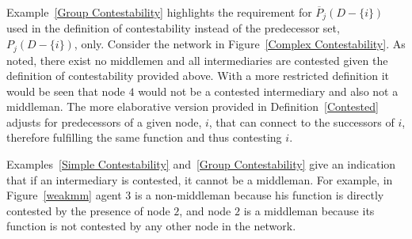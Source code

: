Example~\ref{Group Contestability} highlights the requirement for $\overline{P}_{j}(D - \{i\})$ used in the definition of contestability instead of the predecessor set, $P_{j}(D - \{i\})$, only. Consider the network in Figure~\ref{Complex Contestability}. As noted, there exist no middlemen and all intermediaries are contested given the definition of contestability provided above. With a more restricted definition it would be seen that node $4$ would not be a contested intermediary and also not a middleman. The more elaborative version provided in Definition~\ref{Contested} adjusts for predecessors of a given node, $i$, that can connect to the successors of $i$, therefore fulfilling the same function and thus contesting $i$. 

Examples~\ref{Simple Contestability} and~\ref{Group Contestability} give an indication that if an intermediary is contested, it cannot be a middleman. For example, in Figure~\ref{weakmm} agent $3$ is a non-middleman because his function is directly contested by the presence of node $2$, and node $2$ is a middleman because its function is not contested by any other node in the network.

